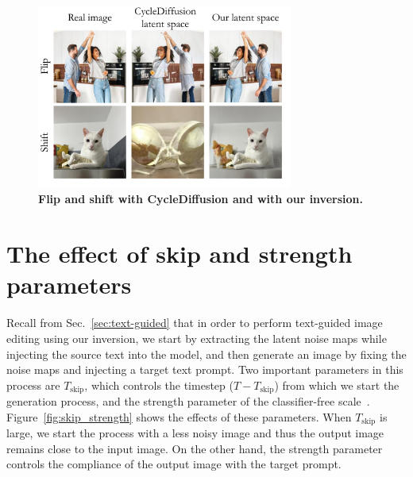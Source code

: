 \begin{figure}[H]
\centering
\includegraphics[width=0.75\textwidth]{ICCV23_submission/figures/cycleDiffusion-flip-and-shift.pdf}
\caption{\textbf{Flip and shift with CycleDiffusion and with our inversion.}}
\label{fig:flip_shift_CycleDiffusion}
\end{figure}





\clearpage

\section{The effect of skip and strength parameters}\label{app:SkipAndStrength}
Recall from Sec.~\ref{sec:text-guided} that in order to perform text-guided image editing using our inversion, we start by extracting the latent noise maps while injecting the source text into the model, and then generate an image by fixing the noise maps and injecting a target text prompt. Two important parameters in this process are  $T_{\text{skip}}$, which controls the timestep ($T-T_{\text{skip}}$) from which we start the generation process, and the strength parameter of the classifier-free scale~\cite{Ho21}.  Figure~\ref{fig:skip_strength} shows the effects of these parameters. When $T_{\text{skip}}$ is large, we start the process with a less noisy image and thus the output image remains close to the input image. On the other hand, the strength parameter controls the compliance of the output image with the target prompt.

